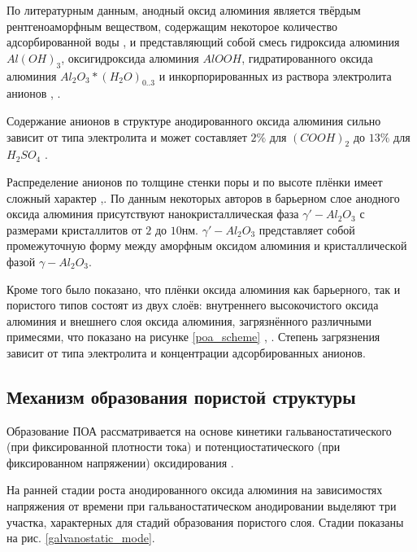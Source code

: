 По литературным данным, анодный оксид алюминия является твёрдым рентгеноаморфным веществом, содержащим некоторое количество адсорбированной воды \cite{napolsky-sintez},\cite{petukhov} и представляющий собой смесь гидроксида алюминия $Al(OH)_3$, оксигидроксида алюминия $AlOOH$, гидратированного оксида алюминия $Al_2O_3*(H_2O)_{0..3}$ и инкорпорированных из раствора электролита анионов \cite{masuda-mosaic}, \cite{napolsky-samoorganizatsiya}.

Содержание анионов в структуре анодированного оксида алюминия сильно зависит от типа электролита и может составляет $2\%$ для $(COOH)_2$ до $13\%$ для $H_2SO_4$ \cite{sheasby-treatment}. 

Распределение анионов по толщине стенки поры и по высоте плёнки имеет сложный характер \cite{coz-analysis},\cite{patermarakis-investigation}. По данным некоторых авторов в барьерном слое анодного оксида алюминия присутствуют нанокристаллическая фаза $\gamma '-Al_2O_3$ с размерами кристаллитов от $2$ до $10 \text{нм}$. $\gamma '-Al_2O_3$ представляет собой промежуточную форму между аморфным оксидом алюминия и кристаллической фазой $\gamma-Al_2O_3$.

Кроме того было показано, что плёнки оксида алюминия как барьерного, так и пористого типов состоят из двух слоёв: внутреннего высокочистого оксида алюминия и внешнего слоя оксида алюминия, загрязнённого различными примесями, что показано на рисунке \ref{poa_scheme} \cite{napolsky-sintez}, \cite{petukhov}. Степень загрязнения зависит от типа электролита и концентрации адсорбированных анионов.

\subsection{Механизм образования пористой структуры}

Образование ПОА рассматривается на основе кинетики гальваностатического (при фиксированной плотности тока) и потенциостатического (при фиксированном напряжении) оксидирования \cite{atraschenko-hyperbolyc}.

На ранней стадии роста анодированного оксида алюминия на зависимостях напряжения от времени при гальваностатическом анодировании выделяют три участка, характерных для стадий образования пористого слоя. Стадии показаны на рис. \ref{galvanostatic_mode}.


